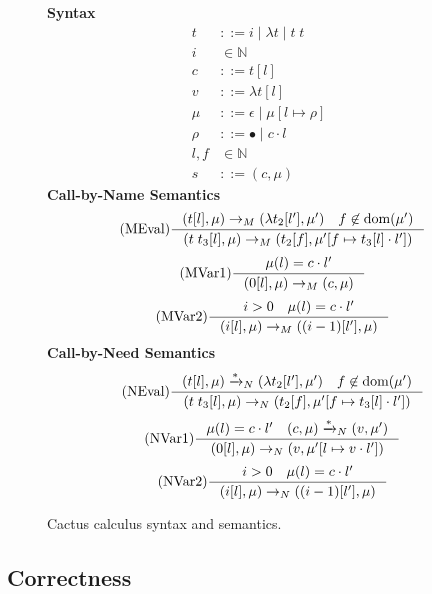 \begin{figure*}
\textbf{Syntax}
\begin{align*}
\tag{Term} t &::= i \; | \; \lambda t \; | \; t \; t  \\
\tag{Variable} i &\in \mathbb{N}  \\
\tag{Closure} c &::= t [l] \\
\tag{Value} v &::= \lambda t [l] \\
\tag{Heap} \mu &::= \epsilon \; | \; \mu [ l \mapsto \rho ] \\
\tag{Environment} \rho &::= \bullet \; | \; c \cdot l \\
\tag{Location} l,f &\in \mathbb{N}  \\
\tag{State} s &::= (c, \mu)
\end{align*}
\textbf{Call-by-Name Semantics}
\begin{align*}
\tag{MEval} \inference
{(t[l], \mu) \rightarrow_{M} (\lambda t_2[l'], \mu') \quad f \not \in \textnormal{dom}(\mu')}
{(t \; t_3[l], \mu) \rightarrow_{M} (t_2[f], \mu'[f \mapsto t_3[l] \cdot l'])}  
\end{align*}
\begin{align*}
\tag{MVar1} \inference 
{\mu(l) = c \cdot l'}
{(0[l],\mu) \rightarrow_M (c,\mu)}
\end{align*}
\begin{align*}
\tag{MVar2} \inference
{i > 0 \quad \mu(l) = c \cdot l'}
{(i[l],\mu) \rightarrow_M ((i-1)[l'],\mu)}
\end{align*}
\textbf{Call-by-Need Semantics}
\begin{align*}
\tag{NEval} \inference
{(t[l], \mu) \xrightarrow{* }_{N} (\lambda t_2[l'], \mu') \quad f \not \in \textnormal{dom}(\mu')}
{(t \; t_3[l], \mu) \rightarrow_{N} (t_2[f], \mu'[f \mapsto t_3[l] \cdot l'])}  
\end{align*}
\begin{align*}
\tag{NVar1} \inference
{\mu(l) = c \cdot l' \quad (c, \mu) \xrightarrow{* }_{N} (v, \mu')}
{(0[l],\mu) \rightarrow_N (v, \mu'[l \mapsto v \cdot l'])}
\end{align*}
\begin{align*}
\tag{NVar2} \inference
{i > 0 \quad \mu(l) = c \cdot l'}
{(i[l],\mu) \rightarrow_N ((i-1)[l'], \mu)}
\end{align*}
\caption{Cactus calculus syntax and semantics.}
\label{fig:calccact}
\end{figure*}

\subsection{Correctness}

